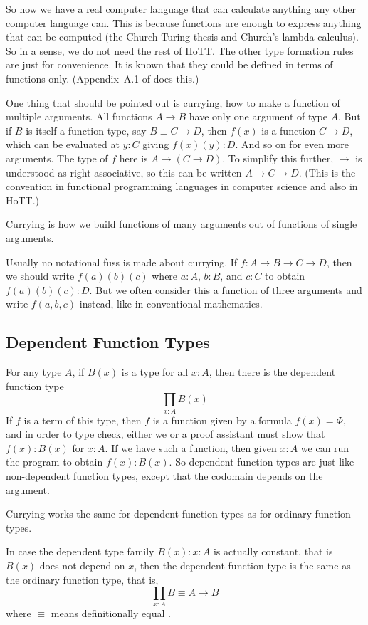 \documentclass[11pt]{article}
\begin{document}
So now we have a real computer language that can calculate anything
any other computer language can.  This is because functions are enough
to express anything that can be computed (the Church-Turing thesis
and Church's lambda calculus).  So in a sense, we do not need the rest
of HoTT.  The other type formation rules are just for convenience.
It is known that they could be defined in terms of functions only.
(Appendix~A.1 of \citet{hott-book} does this.)

One thing that should be pointed out is currying, how to make a function
of multiple arguments.  All functions $A \to B$ have only one argument
of type $A$.  But if $B$ is itself a function type, say $B \equiv C \to D$,
then $f(x)$ is a function $C \to D$, which can be evaluated at $y : C$
giving $f(x)(y) : D$.  And so on for even more arguments.
The type of $f$ here is $A \to (C \to D)$.
To simplify this further, $\to$ is understood as right-associative,
so this can be written $A \to C \to D$.
(This is the convention in functional programming languages
in computer science and also in HoTT.)

Currying is how we build functions of many arguments out of functions of
single arguments.

Usually no notational fuss is made about currying.
If $f : A \to B \to C \to D$, then we should write $f(a)(b)(c)$ where
$a : A$, $b : B$, and $c : C$ to obtain $f(a)(b)(c) : D$.  But we often
consider this a function of three arguments and write $f(a, b, c)$ instead,
like in conventional mathematics.

\subsection{Dependent Function Types}

For any type $A$, if $B(x)$ is a type for all $x : A$, then there is
the dependent function type
$$
   \prod_{x : A} B(x)
$$
If $f$ is a term of this type, then $f$ is a function given by a formula
$f(x) = \Phi$, and in order to type check, either we or a proof assistant
must show that $f(x) : B(x)$ for $x : A$.
If we have such a function, then
given $x : A$ we can run the program to obtain $f(x) : B(x)$.
So dependent function types are just like non-dependent function types,
except that the codomain depends on the argument.

Currying works the same for dependent function types as for ordinary function
types.

In case the dependent type family $B(x) : x : A$ is actually constant,
that is $B(x)$ does not depend on $x$, then the dependent function type is
the same as the ordinary function type, that is,
$$
   \prod_{x : A} B \equiv A \to B
$$
where $\equiv$ means definitionally equal .
\end{document}
